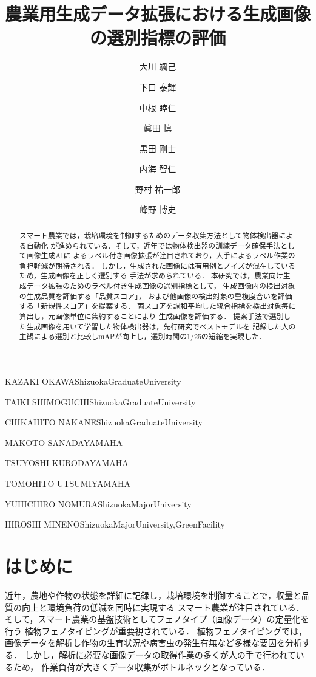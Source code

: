 \documentclass[Japanese]{dicomopapers}
\begin{document}
\title{農業用生成データ拡張における生成画像の選別指標の評価}


\author{大川 颯己}{KAZAKI OKAWA}{ShizuokaGraduateUniversity}
\author{下口 泰輝}{TAIKI SHIMOGUCHI}{ShizuokaGraduateUniversity}
\author{中根 睦仁}{CHIKAHITO NAKANE}{ShizuokaGraduateUniversity}
\author{眞田 慎}{MAKOTO SANADA}{YAMAHA}
\author{黒田 剛士}{TSUYOSHI KURODA}{YAMAHA}
\author{内海 智仁}{TOMOHITO UTSUMI}{YAMAHA} 
\author{野村 祐一郎}{YUHICHIRO NOMURA}{ShizuokaMajorUniversity}
\author{峰野 博史}{HIROSHI MINENO}{ShizuokaMajorUniversity,GreenFacility}

\begin{abstract}
  スマート農業では，栽培環境を制御するためのデータ収集方法として物体検出器による自動化
  が進められている．そして，近年では物体検出器の訓練データ確保手法として画像生成AIに
  よるラベル付き画像拡張が注目されており，人手によるラベル作業の負担軽減が期待される．
  しかし，生成された画像には有用例とノイズが混在しているため，生成画像を正しく選別する
  手法が求められている．
  本研究では，農業向け生成データ拡張のためのラベル付き生成画像の選別指標として，
  生成画像内の検出対象の生成品質を評価する「品質スコア」，
  および他画像の検出対象の重複度合いを評価する「新規性スコア」を提案する．
  両スコアを調和平均した統合指標を検出対象毎に算出し，元画像単位に集約することにより
  生成画像を評価する．
  提案手法で選別した生成画像を用いて学習した物体検出器は，先行研究でベストモデルを
  記録した人の主観による選別と比較しmAPが向上し，選別時間の1/25の短縮を実現した．
\end{abstract}

\maketitle

\section{はじめに}

近年，農地や作物の状態を詳細に記録し，栽培環境を制御することで，収量と品質の向上と環境負荷の低減を同時に実現する
スマート農業が注目されている．そして，スマート農業の基盤技術としてフェノタイプ（画像データ）の定量化を行う
植物フェノタイピングが重要視されている\cite{oomasa2014phenosensing}．
植物フェノタイピングでは，画像データを解析し作物の生育状況や病害虫の発生有無など多様な要因を分析する．
しかし，解析に必要な画像データの取得作業の多くが人の手で行われているため，
作業負荷が大きくデータ収集がボトルネックとなっている\cite{song2021high}．
\end{document}
